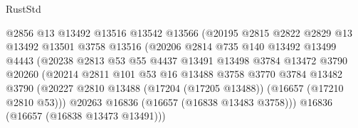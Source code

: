 \begin{lexlean}{RustStd}
\begin{coremodule}
                                    @2856
                                    @13
                                    @13492
                                    @13516
                                    @13542
                                    @13566
                                    (@20195
                                      @2815
                                      @2822
                                      @2829
                                      @13
                                      @13492
                                      @13501
                                      @3758
                                      @13516
                                      (@20206
                                        @2814
                                        @735
                                        @140
                                        @13492
                                        @13499
                                        @4443
                                        (@20238
                                          @2813
                                          @53
                                          @55
                                          @4437
                                          @13491
                                          @13498
                                          @3784
                                          @13472
                                          @3790
                                          @20260
                                          (@20214
                                            @2811
                                            @101
                                            @53
                                            @16
                                            @13488
                                            @3758
                                            @3770
                                            @3784
                                            @13482
                                            @3790
                                            (@20227
                                              @2810
                                              @13488
                                              (@17204 (@17205 @13488))
                                              (@16657 (@17210 @2810 @53)))
                                            @20263
                                            @16836
                                            (@16657 (@16838 @13483 @3758)))
                                          @16836
                                          (@16657 (@16838 @13473 @13491)))

\end{coremodule}
\end{lexlean}
